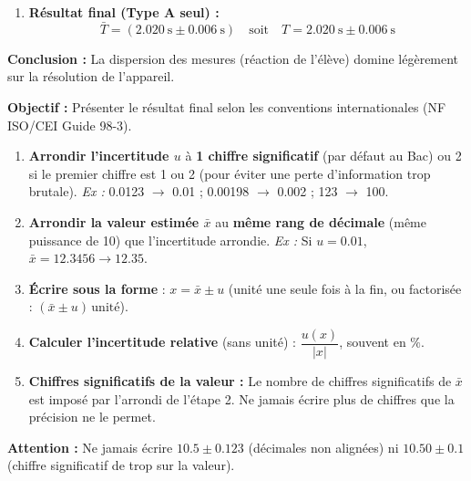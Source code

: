 \documentclass[11pt]{article}
\begin{document}
\begin{exoresolu}
\begin{enumerate}
              $u_B = \frac{\SI{0,01}{\second}}{2} = \SI{0,005}{\second}$.
              $u_A = \SI{0,006}{\second}$.
              Elles sont du même ordre de grandeur. Aucune n'est négligeable. L'incertitude combinée serait $u_c = \sqrt{\num{0,006}^2 + \num{0,005}^2} \approx \SI{0,008}{\second}$.
              \emph{Au Bac, si on ne demande que l'incertitude Type A, on donne $u_A$.}
        \item \textbf{Résultat final (Type A seul) :}
              \[ \boxed{\bar{T} = (\SI{2,020}{\second} \pm \SI{0,006}{\second})} \quad \text{soit} \quad \boxed{T = \SI{2,020}{\second} \pm \SI{0,006}{\second}} \]
    \end{enumerate}
    \textbf{Conclusion :} La dispersion des mesures (réaction de l'élève) domine légèrement sur la résolution de l'appareil.
\end{exoresolu}

\begin{methode}
    \textbf{Objectif :} Présenter le résultat final selon les conventions internationales (NF ISO/CEI Guide 98-3).
    \begin{enumerate}
        \item \textbf{Arrondir l'incertitude $u$} à \textbf{1 chiffre significatif} (par défaut au Bac) ou 2 si le premier chiffre est 1 ou 2 (pour éviter une perte d'information trop brutale).
              \emph{Ex :} \num{0,0123} $\to$ \num{0,01} ; \num{0,00198} $\to$ \num{0,002} ; \num{123} $\to$ \num{100}.
        \item \textbf{Arrondir la valeur estimée $\bar{x}$} au \textbf{même rang de décimale} (même puissance de 10) que l'incertitude arrondie.
              \emph{Ex :} Si $u = \num{0,01}$, $\bar{x} = \num{12,3456} \to \num{12,35}$.
        \item \textbf{Écrire sous la forme} : $\boxed{x = \bar{x} \pm u}$ (unité une seule fois à la fin, ou factorisée : $(\bar{x} \pm u)\,\text{unité}$).
        \item \textbf{Calculer l'incertitude relative} (sans unité) : $\dfrac{u(x)}{|x|}$, souvent en $\%$.
        \item \textbf{Chiffres significatifs de la valeur :} Le nombre de chiffres significatifs de $\bar{x}$ est imposé par l'arrondi de l'étape 2. Ne jamais écrire plus de chiffres que la précision ne le permet.
    \end{enumerate}
    \textbf{Attention :} Ne jamais écrire $\num{10,5} \pm \num{0,123}$ (décimales non alignées) ni $\num{10,50} \pm \num{0,1}$ (chiffre significatif de trop sur la valeur).
\end{methode}
\end{document}
